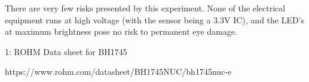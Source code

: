 \documentclass{article}
\begin{document}
\noindent{}There are very few risks presented by this experiment. None of the electrical equipment runs at high voltage (with the sensor being a 3.3V IC), and the LED's at maximum brightness pose no risk to permanent eye damage.%

{%
\begin{thebibliography}{0}%
\label{sec-bibliography}%

\mdbibitemlabel{}1: ROHM Data sheet for BH1745

https://www.rohm.com/datasheet/BH1745NUC/bh1745nuc-e%
\label{sensor}%
\par%
\end{thebibliography}}%
\end{document}

